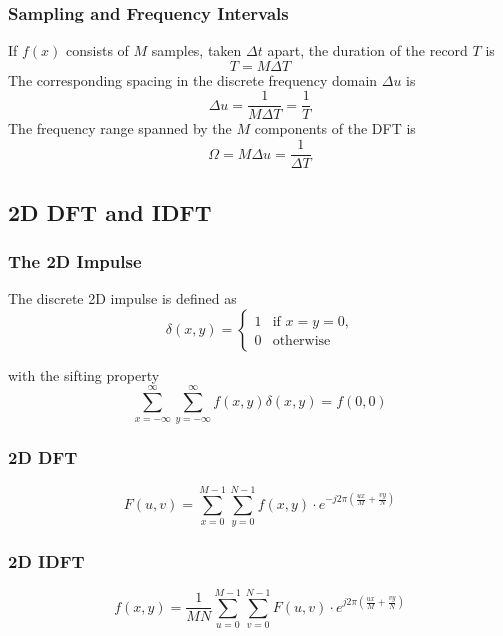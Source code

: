 \subsubsection{Sampling and Frequency Intervals }
If $f(x)$ consists of $M$ samples, taken $\Delta t$ apart, the duration of the record $T$ is
\begin{equation}
	T = M \Delta T
\end{equation}
The corresponding spacing in the discrete frequency domain $\Delta u$ is
\begin{equation}
	\Delta u = \frac{1}{M \Delta T} = \frac{1}{T}
\end{equation}
The frequency range spanned by the $M$ components of the DFT is
\begin{equation}
	\Omega = M \Delta u = \frac{1}{\Delta T}
\end{equation} 
 
\subsection{2D DFT and IDFT }
\subsubsection{The 2D Impulse}
The discrete 2D impulse is defined as
\begin{equation}
\delta(x,y) = 
\begin{cases} 1 & \text{if $x=y=0$,}
\\
0 &\text{otherwise}
\end{cases}
\end{equation}

with the sifting property
\begin{equation}
\sum_{x=-\infty}^{\infty}\sum_{y=-\infty}^{\infty}f(x,y) \delta(x,y) = f(0,0)
\end{equation}

\subsubsection{2D DFT}
\begin{equation}
    F(u,v) = \sum_{x=0}^{M-1}\sum_{y=0}^{N-1}f(x,y)\cdot e^{-j2\pi \left(\frac{ux}{M}+ \frac{vy}{N}\right)}
\end{equation}

\subsubsection{2D IDFT}
\begin{equation}
    f(x,y) = \frac{1}{MN} \sum_{u=0}^{M-1}\sum_{v=0}^{N-1}F(u,v)\cdot e^{j2\pi \left(\frac{ux}{M}+ \frac{vy}{N}\right)}
\end{equation}

